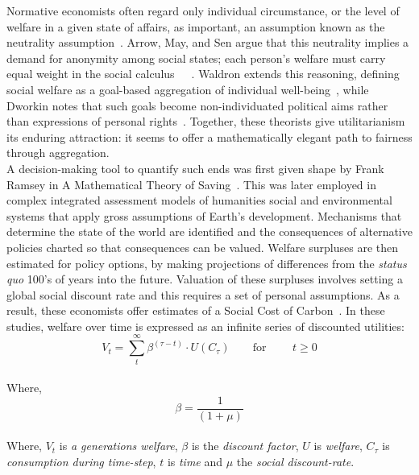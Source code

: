 \documentclass[12pt, oneside]{article}   	%
\begin{document}
Normative economists often regard only individual circumstance, or the level of welfare in a given state of affairs, as important, an assumption known as the neutrality assumption~\cite{pd2}.
Arrow, May, and Sen argue that this neutrality implies a demand for anonymity among social states; each person’s welfare must carry equal weight in the social calculus~\cite{ka1}~\cite{km1}~\cite{as2}.
Waldron extends this reasoning, defining social welfare as a goal-based aggregation of individual well-being~\cite{jw2}, while Dworkin notes that such goals become non-individuated political aims rather than expressions of personal rights~\cite{rd1}.
Together, these theorists give utilitarianism its enduring attraction: it seems to offer a mathematically elegant path to fairness through aggregation.\\

A decision-making tool to quantify such ends was first given shape by Frank Ramsey in A Mathematical Theory of Saving~\cite{fr1}.
This was later employed in complex integrated assessment models of humanities social and environmental systems that apply gross assumptions of Earth's development.
Mechanisms that determine the state of the world are identified and the consequences of alternative policies charted so that consequences can be valued.
Welfare surpluses are then estimated for policy options, by making projections of differences from the \emph{status quo} 100's of years into the future.
Valuation of these surpluses involves setting a global social discount rate and this requires a set of personal assumptions.
As a result, these economists offer estimates of a Social Cost of Carbon~\cite{pd2}.
In these studies, welfare over time is expressed as an infinite series of discounted utilities:\\

\begin{equation}
V_t = \sum_t^\infty \beta^{(\tau - t)} \cdot U (C_\tau)
\qquad \text{for }
\qquad t \geq 0
\end{equation}\\

Where,
\begin{equation}
\beta = \frac{1}{(1+\mu)}
\end{equation}\\

Where, $V_t$ is \emph{a generations welfare}, $\beta$ is the \emph{discount factor}, $U$ is \emph{welfare}, $C_\tau$ is \emph{consumption during time-step}, $t$ is \emph{time} and $\mu$ the \emph{social discount-rate}.\\
\end{document}
